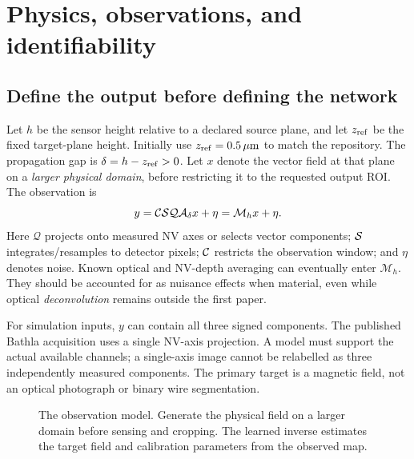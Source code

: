 \section{Physics, observations, and identifiability}
\label{sec:physics}
\subsection{Define the output before defining the network}
Let $h$ be the sensor height relative to a declared source plane, and let $z_{\rm ref}$ be the fixed target-plane height. Initially use $z_{\rm ref}=0.5\,\mu\mathrm m$ to match the repository. The propagation gap is $\delta=h-z_{\rm ref}>0$.
Let $x$ denote the vector field at that plane on a \emph{larger physical domain}, before restricting it to the requested output ROI. The observation is
\begin{equation}
 y=\mathcal C\mathcal S\mathcal Q\mathcal A_{\delta}x+\eta
   =\mathcal M_hx+\eta.\label{eq:obs}
\end{equation}
Here $\mathcal Q$ projects onto measured NV axes or selects vector components; $\mathcal S$ integrates/resamples to detector pixels; $\mathcal C$ restricts the observation window; and $\eta$ denotes noise. Known optical and NV-depth averaging can eventually enter $\mathcal M_h$. They should be accounted for as nuisance effects when material, even while optical \emph{deconvolution} remains outside the first paper.

For simulation inputs, $y$ can contain all three signed components. The published Bathla acquisition uses a single NV-axis projection. A model must support the actual available channels; a single-axis image cannot be relabelled as three independently measured components. The primary target is a magnetic field, not an optical photograph or binary wire segmentation.

\begin{figure}[htbp]\centering
{}
\caption{The observation model. Generate the physical field on a larger domain before sensing and cropping. The learned inverse estimates the target field and calibration parameters from the observed map.}
\end{figure}

